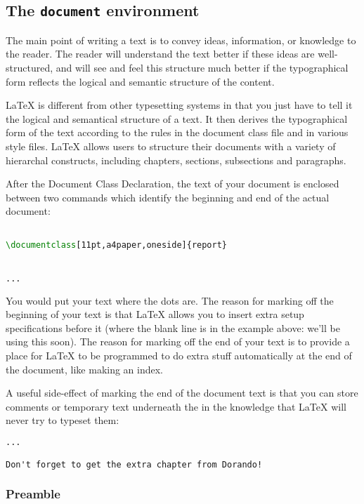 \subsection{The \texttt{document} environment}
The main point of writing a text is to convey ideas, information, or knowledge to the reader. The reader will
understand the text better if these ideas are well-structured, and will see and feel this structure much better if the typographical form reflects the logical and semantic structure of the content.

LaTeX is different from other typesetting systems in that you just have to tell it the logical and semantical structure of a text. It then derives
the typographical form of the text according to the rules in the document class file and in various style files. LaTeX allows users to structure their documents with a variety of hierarchal constructs, including chapters, sections, subsections and paragraphs. 

After the Document Class Declaration, the text of your document is enclosed between two commands which identify the beginning and end of the actual document:
\begin{lstlisting}[language={TeX}, breaklines=true,xleftmargin=15pt]

\documentclass[11pt,a4paper,oneside]{report}


...


\end{lstlisting}


You would put your text where the dots are. The reason for marking off the beginning of your text is that LaTeX allows you to insert extra setup specifications before it (where the blank line is in the example above: we'll be using this soon). The reason for marking off the end of your text is to provide a place for LaTeX to be programmed to do extra stuff automatically at the end of the document, like making an index.

A useful side-effect of marking the end of the document text is that you can store comments or temporary text underneath the \texttt{} in the knowledge that LaTeX will never try to typeset them:
\begin{lstlisting}[language={TeX}, breaklines=true,xleftmargin=15pt]
...

Don't forget to get the extra chapter from Dorando!

\end{lstlisting}

\subsubsection{ Preamble }

